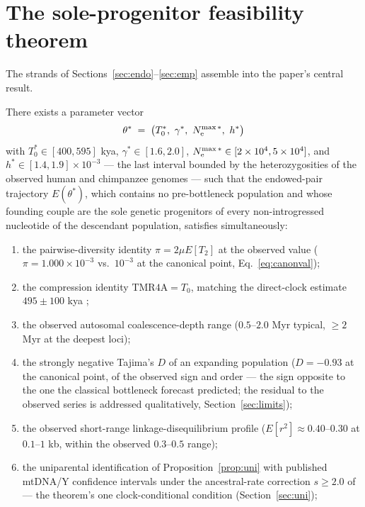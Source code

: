 \section{The sole-progenitor feasibility theorem}\label{sec:theorem}

The strands of Sections~\ref{sec:endo}--\ref{sec:emp} assemble into the
paper's central result.

\begin{theorem}\label{thm:main}
There exists a parameter vector
\[
\theta^{*} \;=\; \bigl(T_0^{*},\ \gamma^{*},\ \Ne^{\max*},\ h^{*}\bigr)
\]
with $T_0^{*} \in [400, 595]$ kya, $\gamma^{*} \in [1.6, 2.0]$,
$N_{\mathrm{e}}^{\max*} \in [2\times10^{4}, 5\times10^{4}]$, and
$h^{*} \in [1.4, 1.9]\times10^{-3}$ --- the last interval bounded by the
heterozygosities of the observed human and chimpanzee genomes
\citep{PradoMartinez2013,Auton2015} --- such that the endowed-pair
trajectory $E(\theta^{*})$, which contains no pre-bottleneck population
and whose founding couple are the sole genetic progenitors of every
non-introgressed nucleotide of the descendant population, satisfies
simultaneously:
\begin{enumerate}
\item the pairwise-diversity identity $\pi = 2\mu E[T_2]$ at the observed
value ($\pi = 1.000\times10^{-3}$ vs.\ $10^{-3}$ at the canonical point,
Eq.~\eqref{eq:canonval});
\item the compression identity $\mathrm{TMR4A} = T_0$, matching the
direct-clock estimate $495 \pm 100$ kya \citep{Swamidass2019,Swamidass2022};
\item the observed autosomal coalescence-depth range
($0.5$--$2.0$ Myr typical, $\ge 2$ Myr at the deepest loci);
\item the strongly negative Tajima's $D$ of an expanding population
($D = -0.93$ at the canonical point, of the observed sign and order ---
the sign opposite to the one the classical bottleneck forecast predicted;
the residual to the observed series is addressed qualitatively,
Section~\ref{sec:limits});
\item the observed short-range linkage-disequilibrium profile
($E[r^2] \approx 0.40$--$0.30$ at $0.1$--$1$ kb, within the observed
$0.3$--$0.5$ range);
\item the uniparental identification of Proposition~\ref{prop:uni} with
published mtDNA/Y confidence intervals under the ancestral-rate
correction $s \ge 2.0$ of \citet{Scally2012} --- the theorem's one
clock-conditional condition (Section~\ref{sec:uni});

\end{enumerate}
\end{theorem}
